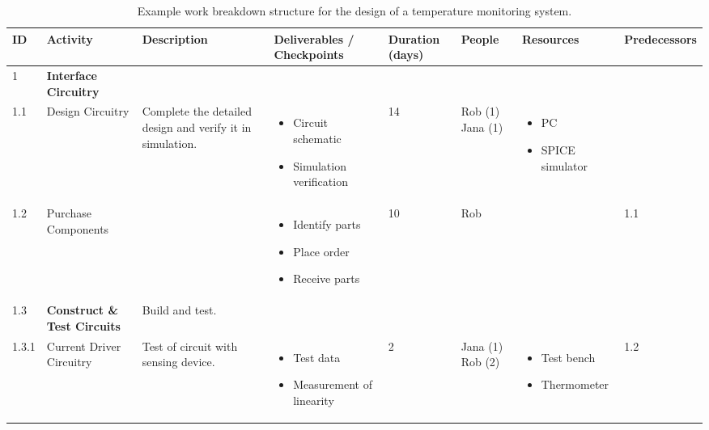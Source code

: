 \begin{table}
\caption{Example work breakdown structure for the design of a
temperature monitoring system.}
\label{table:workBreakDownStructureExample}
\begin{tabular}{|m{1cm}|m{1cm}|m{1cm}|m{1cm}|m{1cm}|m{1cm}|m{1cm}|m{1cm}|   }
\hline
\textbf{ID} & \textbf{Activity} & \textbf{Description} & \textbf{Deliverables / Checkpoints} & \textbf{Duration (days)} & \textbf{People} & \textbf{Resources} & \textbf{Predecessors} \\ \hline

1 & \textbf{Interface Circuitry} & & & & & & \\
1.1 & Design Circuitry & Complete the detailed design and verify it in simulation. & 
	\begin{itemize} 	\item Circuit schematic 	\item Simulation verification 	\end{itemize}
	& 14 & Rob (1) Jana (1) & 
	\begin{itemize} \item PC \item SPICE simulator \end{itemize} & \\ \hline

1.2 & Purchase Components & & 
	\begin{itemize} \item Identify parts \item Place order \item Receive parts \end{itemize}
	& 10 & Rob & & 1.1 \\ \hline

1.3 &  \textbf{Construct \& Test Circuits} & Build and test. & & & & & \\ \hline

1.3.1 & Current Driver Circuitry & Test of circuit with sensing device. & 
	\begin{itemize} \item Test data  \item Measurement of linearity \end{itemize}
	& 2 & Jana (1) Rob (2) & 
	\begin{itemize} \item Test bench \item Thermometer \end{itemize} & 1.2 \\ \hline


\end{tabular}
\end{table}
